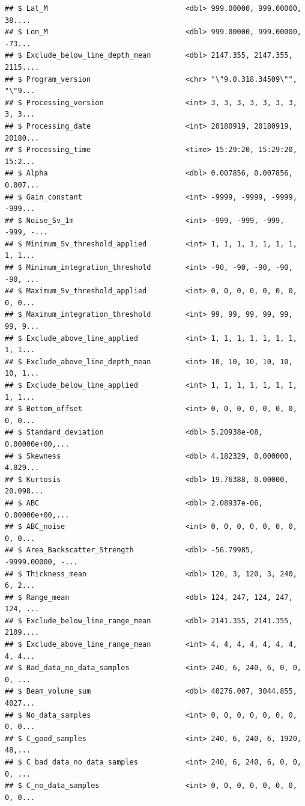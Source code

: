 \documentclass[]{article}
\begin{document}
\begin{verbatim}
## $ Lat_M                                <dbl> 999.00000, 999.00000, 38....
## $ Lon_M                                <dbl> 999.00000, 999.00000, -73...
## $ Exclude_below_line_depth_mean        <dbl> 2147.355, 2147.355, 2115....
## $ Program_version                      <chr> "\"9.0.318.34509\"", "\"9...
## $ Processing_version                   <int> 3, 3, 3, 3, 3, 3, 3, 3, 3...
## $ Processing_date                      <int> 20180919, 20180919, 20180...
## $ Processing_time                      <time> 15:29:20, 15:29:20, 15:2...
## $ Alpha                                <dbl> 0.007856, 0.007856, 0.007...
## $ Gain_constant                        <int> -9999, -9999, -9999, -999...
## $ Noise_Sv_1m                          <int> -999, -999, -999, -999, -...
## $ Minimum_Sv_threshold_applied         <int> 1, 1, 1, 1, 1, 1, 1, 1, 1...
## $ Minimum_integration_threshold        <int> -90, -90, -90, -90, -90, ...
## $ Maximum_Sv_threshold_applied         <int> 0, 0, 0, 0, 0, 0, 0, 0, 0...
## $ Maximum_integration_threshold        <int> 99, 99, 99, 99, 99, 99, 9...
## $ Exclude_above_line_applied           <int> 1, 1, 1, 1, 1, 1, 1, 1, 1...
## $ Exclude_above_line_depth_mean        <int> 10, 10, 10, 10, 10, 10, 1...
## $ Exclude_below_line_applied           <int> 1, 1, 1, 1, 1, 1, 1, 1, 1...
## $ Bottom_offset                        <int> 0, 0, 0, 0, 0, 0, 0, 0, 0...
## $ Standard_deviation                   <dbl> 5.20938e-08, 0.00000e+00,...
## $ Skewness                             <dbl> 4.182329, 0.000000, 4.029...
## $ Kurtosis                             <dbl> 19.76388, 0.00000, 20.098...
## $ ABC                                  <dbl> 2.08937e-06, 0.00000e+00,...
## $ ABC_noise                            <int> 0, 0, 0, 0, 0, 0, 0, 0, 0...
## $ Area_Backscatter_Strength            <dbl> -56.79985, -9999.00000, -...
## $ Thickness_mean                       <dbl> 120, 3, 120, 3, 240, 6, 2...
## $ Range_mean                           <dbl> 124, 247, 124, 247, 124, ...
## $ Exclude_below_line_range_mean        <dbl> 2141.355, 2141.355, 2109....
## $ Exclude_above_line_range_mean        <int> 4, 4, 4, 4, 4, 4, 4, 4, 4...
## $ Bad_data_no_data_samples             <int> 240, 6, 240, 6, 0, 0, 0, ...
## $ Beam_volume_sum                      <dbl> 40276.007, 3044.855, 4027...
## $ No_data_samples                      <int> 0, 0, 0, 0, 0, 0, 0, 0, 0...
## $ C_good_samples                       <int> 240, 6, 240, 6, 1920, 48,...
## $ C_bad_data_no_data_samples           <int> 240, 6, 240, 6, 0, 0, 0, ...
## $ C_no_data_samples                    <int> 0, 0, 0, 0, 0, 0, 0, 0, 0...

\end{verbatim}
\end{document}
